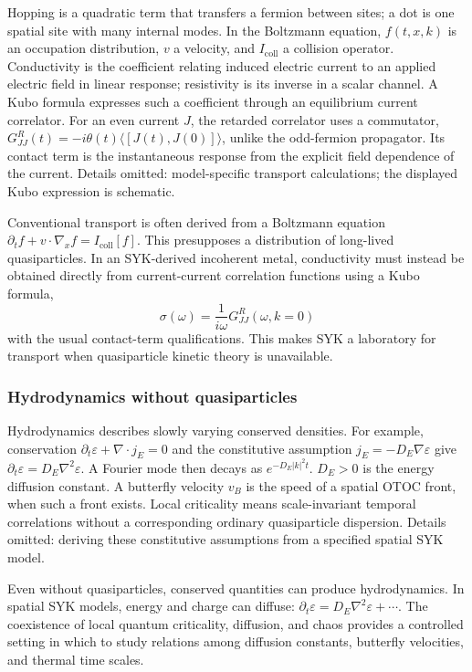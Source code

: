 \documentclass[11pt]{article}
\numberwithin{equation}{section}
\theoremstyle{exposition}
\theoremstyle{result}
\begin{document}
Hopping is a quadratic term that transfers a fermion between sites; a dot is one spatial site with many internal modes. In the Boltzmann equation, $f(t,x,k)$ is an occupation distribution, $v$ a velocity, and $I_{\mathrm{coll}}$ a collision operator. Conductivity is the coefficient relating induced electric current to an applied electric field in linear response; resistivity is its inverse in a scalar channel. A Kubo formula expresses such a coefficient through an equilibrium current correlator. For an even current $J$, the retarded correlator uses a commutator, $G^R_{JJ}(t)=-i\theta(t)\langle[J(t),J(0)]\rangle$, unlike the odd-fermion propagator. Its contact term is the instantaneous response from the explicit field dependence of the current. Details omitted: model-specific transport calculations; the displayed Kubo expression is schematic.

Conventional transport is often derived from a Boltzmann equation $\partial_t f+v\cdot\nabla_x f=I_{\mathrm{coll}}[f]$. This presupposes a distribution of long-lived quasiparticles. In an SYK-derived incoherent metal, conductivity must instead be obtained directly from current-current correlation functions using a Kubo formula,
\begin{equation*}
\sigma(\omega)=\frac1{i\omega}G^R_{JJ}(\omega,k=0)
\end{equation*}
with the usual contact-term qualifications. This makes SYK a laboratory for transport when quasiparticle kinetic theory is unavailable.

\subsubsection{Hydrodynamics without quasiparticles}


Hydrodynamics describes slowly varying conserved densities. For example, conservation $\partial_t\varepsilon+\nabla\cdot j_E=0$ and the constitutive assumption $j_E=-D_E\nabla\varepsilon$ give $\partial_t\varepsilon=D_E\nabla^2\varepsilon$. A Fourier mode then decays as $e^{-D_E|k|^2t}$. $D_E>0$ is the energy diffusion constant. A butterfly velocity $v_B$ is the speed of a spatial OTOC front, when such a front exists. Local criticality means scale-invariant temporal correlations without a corresponding ordinary quasiparticle dispersion. Details omitted: deriving these constitutive assumptions from a specified spatial SYK model.

Even without quasiparticles, conserved quantities can produce hydrodynamics. In spatial SYK models, energy and charge can diffuse: $\partial_t \varepsilon=D_E\nabla^2\varepsilon+\cdots$. The coexistence of local quantum criticality, diffusion, and chaos provides a controlled setting in which to study relations among diffusion constants, butterfly velocities, and thermal time scales.
\end{document}
